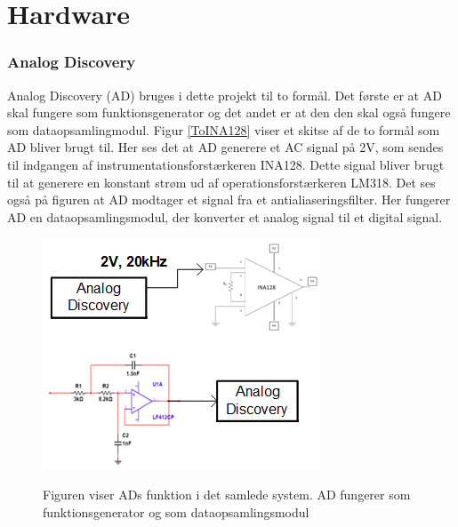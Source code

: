 \chapter{Hardware}

\subsection{Analog Discovery}
Analog Discovery (AD) bruges i dette projekt til to formål. Det første er at AD skal fungere som funktionsgenerator og det andet er at den den skal også fungere som dataopsamlingmodul. Figur \ref{ToINA128} viser et skitse af de to formål som AD bliver brugt til. Her ses det at AD generere et AC signal på 2V, som sendes til indgangen af instrumentationsforstærkeren INA128. Dette signal bliver brugt til at generere en konstant strøm ud af operationsforstærkeren LM318. Det ses også på figuren at AD modtager et signal fra et antialiaseringsfilter. Her fungerer AD en dataopsamlingsmodul, der konverter et analog signal til et digital signal. 


   
\begin{figure}[H]
\centering
{\includegraphics[width=\linewidth]
{Figure/ADogINA128}}
\caption{Figuren viser ADs funktion i det samlede system. AD fungerer som funktionsgenerator og som dataopsamlingsmodul}
\label{analogOgINA}
\end{figure}


